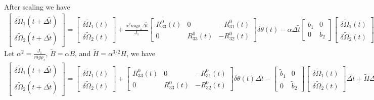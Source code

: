 \documentclass[10pt]{article}
\begin{document}
After scaling we have
\begin{align*}
	\begin{bmatrix} \delta\tilde{\Omega}_1(t+\Delta \tilde{t}) \\ \delta\tilde{\Omega}_2(t+\Delta \tilde{t}) \end{bmatrix} = \begin{bmatrix} \delta\tilde{\Omega}_1(t) \\ \delta\tilde{\Omega}_2(t) \end{bmatrix} + \frac{\alpha^2 mg\rho_z \Delta \tilde{t}}{J_1} \begin{bmatrix} R_{33}^0(t) & 0 & -R_{31}^0(t) \\ 0 & R_{33}^0(t) & -R_{32}^0(t) \end{bmatrix} \delta\theta(t) - \alpha \Delta\tilde{t} \begin{bmatrix} b_1 & 0 \\ 0 & b_2 \end{bmatrix} \begin{bmatrix} \delta\tilde{\Omega}_1(t) \\ \delta\tilde{\Omega}_2(t) \end{bmatrix} + \alpha^{3/2} H \Delta W_{\tilde{t}}.
\end{align*}
Let $\alpha^2 = \tfrac{J_1}{mg\rho_z}$, $\tilde{B} = \alpha B$, and $\tilde{H} = \alpha^{3/2}H$, we have
\begin{align}
	\begin{bmatrix} \delta\tilde{\Omega}_1(t+\Delta \tilde{t}) \\ \delta\tilde{\Omega}_2(t+\Delta \tilde{t}) \end{bmatrix} = \begin{bmatrix} \delta\tilde{\Omega}_1(t) \\ \delta\tilde{\Omega}_2(t) \end{bmatrix} + \begin{bmatrix} R_{33}^0(t) & 0 & -R_{31}^0(t) \\ 0 & R_{33}^0(t) & -R_{32}^0(t) \end{bmatrix} \delta\theta(t) \Delta\tilde{t} - \begin{bmatrix} \tilde{b}_1 & 0 \\ 0 & \tilde{b}_2 \end{bmatrix} \begin{bmatrix} \delta\tilde{\Omega}_1(t) \\ \delta\tilde{\Omega}_2(t) \end{bmatrix} \Delta\tilde{t} + \tilde{H} \Delta W_{\tilde{t}}.
\end{align}
\end{document}
